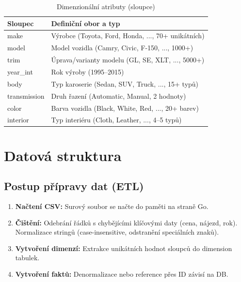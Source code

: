 \documentclass[12pt,a4paper]{article}
\begin{document}
\begin{table}[H]
    \centering
    \caption{Dimenzionální atributy (sloupce)}
    \begin{tabularx}{\textwidth}{|l|X|}
        \hline
        \textbf{Sloupec} & \textbf{Definiční obor a typ} \\
        \hline
        make & Výrobce (Toyota, Ford, Honda, ..., 70+ unikátních) \\
        \hline
        model & Model vozidla (Camry, Civic, F-150, ..., 1000+) \\
        \hline
        trim & Úprava/varianty modelu (GL, SE, XLT, ..., 5000+) \\
        \hline
        year\_int & Rok výroby (1995–2015) \\
        \hline
        body & Typ karoserie (Sedan, SUV, Truck, ..., 15+ typů) \\
        \hline
        transmission & Druh řazení (Automatic, Manual, 2 hodnoty) \\
        \hline
        color & Barva vozidla (Black, White, Red, ..., 20+ barev) \\
        \hline
        interior & Typ interiéru (Cloth, Leather, ..., 4–5 typů) \\
        \hline
    \end{tabularx}
\end{table}

\newpage

\section{Datová struktura}

\subsection{Postup přípravy dat (ETL)}

\begin{enumerate}
    \item \textbf{Načtení CSV:} Surový soubor se načte do paměti na straně Go.
    \item \textbf{Čištění:} Odebrání řádků s chybějícími klíčovými daty (cena, nájezd, rok).
            Normalizace stringů (case-insensitive, odstranění speciálních znaků).
    \item \textbf{Vytvoření dimenzí:} Extrakce unikátních hodnot sloupců do dimension tabulek.
    \item \textbf{Vytvoření faktů:} Denormalizace nebo reference přes ID závisí na DB.
\end{enumerate}
\end{document}
